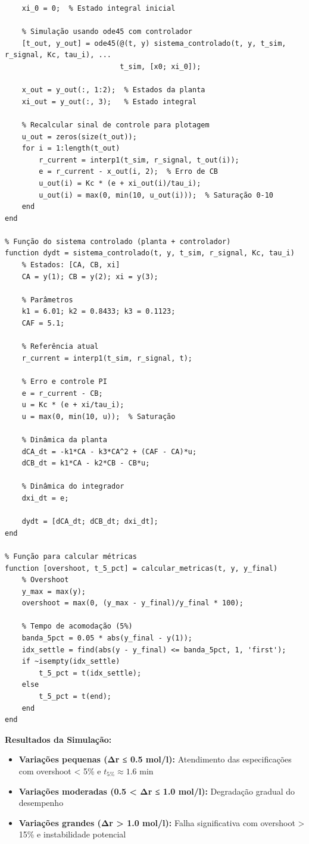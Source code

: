 \documentclass[a4paper,12pt]{article}
\begin{document}
\begin{lstlisting}[caption=Simulação do controle PI em sistema não linear]
    % Estados do controlador PI (integral)
    xi_0 = 0;  % Estado integral inicial
    
    % Simulação usando ode45 com controlador
    [t_out, y_out] = ode45(@(t, y) sistema_controlado(t, y, t_sim, r_signal, Kc, tau_i), ...
                           t_sim, [x0; xi_0]);
    
    x_out = y_out(:, 1:2);  % Estados da planta
    xi_out = y_out(:, 3);   % Estado integral
    
    % Recalcular sinal de controle para plotagem
    u_out = zeros(size(t_out));
    for i = 1:length(t_out)
        r_current = interp1(t_sim, r_signal, t_out(i));
        e = r_current - x_out(i, 2);  % Erro de CB
        u_out(i) = Kc * (e + xi_out(i)/tau_i);
        u_out(i) = max(0, min(10, u_out(i)));  % Saturação 0-10
    end
end

% Função do sistema controlado (planta + controlador)
function dydt = sistema_controlado(t, y, t_sim, r_signal, Kc, tau_i)
    % Estados: [CA, CB, xi]
    CA = y(1); CB = y(2); xi = y(3);
    
    % Parâmetros
    k1 = 6.01; k2 = 0.8433; k3 = 0.1123;
    CAF = 5.1;
    
    % Referência atual
    r_current = interp1(t_sim, r_signal, t);
    
    % Erro e controle PI
    e = r_current - CB;
    u = Kc * (e + xi/tau_i);
    u = max(0, min(10, u));  % Saturação
    
    % Dinâmica da planta
    dCA_dt = -k1*CA - k3*CA^2 + (CAF - CA)*u;
    dCB_dt = k1*CA - k2*CB - CB*u;
    
    % Dinâmica do integrador
    dxi_dt = e;
    
    dydt = [dCA_dt; dCB_dt; dxi_dt];
end

% Função para calcular métricas
function [overshoot, t_5_pct] = calcular_metricas(t, y, y_final)
    % Overshoot
    y_max = max(y);
    overshoot = max(0, (y_max - y_final)/y_final * 100);
    
    % Tempo de acomodação (5%)
    banda_5pct = 0.05 * abs(y_final - y(1));
    idx_settle = find(abs(y - y_final) <= banda_5pct, 1, 'first');
    if ~isempty(idx_settle)
        t_5_pct = t(idx_settle);
    else
        t_5_pct = t(end);
    end
end
\end{lstlisting}

\textbf{Resultados da Simulação:}
\begin{itemize}
\item \textbf{Variações pequenas (Δr ≤ 0.5 mol/l):} Atendimento das especificações com overshoot < 5\% e $t_{5\%} ≈ 1.6$ min
\item \textbf{Variações moderadas (0.5 < Δr ≤ 1.0 mol/l):} Degradação gradual do desempenho
\item \textbf{Variações grandes (Δr > 1.0 mol/l):} Falha significativa com overshoot > 15\% e instabilidade potencial
\end{itemize}
\end{document}
